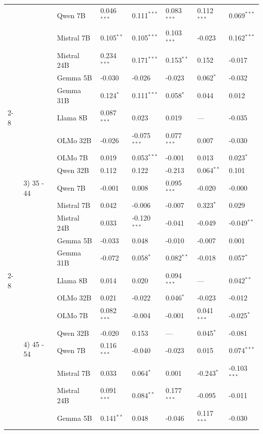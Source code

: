 \begin{longtable}[t]{llllllll}
 &  & Qwen 7B & 0.046$^{***}$ & 0.111$^{***}$ & 0.083$^{***}$ & 0.112$^{***}$ & 0.069$^{***}$ \\
 &  & Mistral 7B & 0.105$^{**}$ & 0.105$^{***}$ & 0.103$^{***}$ & -0.023 & 0.162$^{***}$ \\
 &  & Mistral 24B & 0.234$^{***}$ & 0.171$^{***}$ & 0.153$^{**}$ & 0.152 & -0.017 \\
 &  & Gemma 5B & -0.030 & -0.026 & -0.023 & 0.062$^{*}$ & -0.032 \\
 &  & Gemma 31B & 0.124$^{*}$ & 0.111$^{***}$ & 0.058$^{*}$ & 0.044 & 0.012 \\
\cline{2-8}
 & \multirow[t]{9}{*}{3) 35 - 44} & Llama 8B & 0.087$^{***}$ & 0.023 & 0.019 & --- & -0.035 \\
 &  & OLMo 32B & -0.026 & -0.075$^{***}$ & 0.077$^{***}$ & 0.007 & -0.030 \\
 &  & OLMo 7B & 0.019 & 0.053$^{***}$ & -0.001 & 0.013 & 0.023$^{*}$ \\
 &  & Qwen 32B & 0.112 & 0.122 & -0.213 & 0.064$^{**}$ & 0.101 \\
 &  & Qwen 7B & -0.001 & 0.008 & 0.095$^{***}$ & -0.020 & -0.000 \\
 &  & Mistral 7B & 0.042 & -0.006 & -0.007 & 0.323$^{*}$ & 0.029 \\
 &  & Mistral 24B & 0.033 & -0.120$^{***}$ & -0.041 & -0.049 & -0.049$^{**}$ \\
 &  & Gemma 5B & -0.033 & 0.048 & -0.010 & -0.007 & 0.001 \\
 &  & Gemma 31B & -0.072 & 0.058$^{*}$ & 0.082$^{**}$ & -0.018 & 0.057$^{*}$ \\
\cline{2-8}
 & \multirow[t]{9}{*}{4) 45 - 54} & Llama 8B & 0.014 & 0.020 & 0.094$^{***}$ & --- & 0.042$^{**}$ \\
 &  & OLMo 32B & 0.021 & -0.022 & 0.046$^{*}$ & -0.023 & -0.012 \\
 &  & OLMo 7B & 0.082$^{***}$ & -0.004 & -0.001 & 0.041$^{***}$ & -0.025$^{*}$ \\
 &  & Qwen 32B & -0.020 & 0.153 & --- & 0.045$^{*}$ & -0.081 \\
 &  & Qwen 7B & 0.116$^{***}$ & -0.040 & -0.023 & 0.015 & 0.074$^{***}$ \\
 &  & Mistral 7B & 0.033 & 0.064$^{*}$ & 0.001 & -0.243$^{*}$ & -0.103$^{***}$ \\
 &  & Mistral 24B & 0.091$^{***}$ & 0.084$^{**}$ & 0.177$^{***}$ & -0.095 & -0.011 \\
 &  & Gemma 5B & 0.141$^{**}$ & 0.048 & -0.046 & 0.117$^{***}$ & -0.030 \\

\end{longtable}
